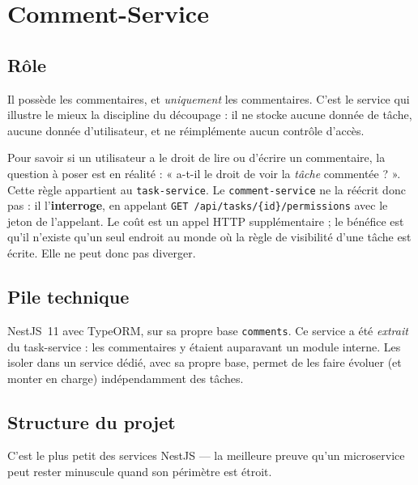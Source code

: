 \documentclass[11pt,a4paper,oneside]{report}
\newcommand{\code}[1]{\texttt{\small #1}}
\begin{document}
\section{Comment-Service}

\subsection{Rôle}

Il possède les commentaires, et \emph{uniquement} les commentaires. C'est le
service qui illustre le mieux la discipline du découpage : il ne stocke aucune
donnée de tâche, aucune donnée d'utilisateur, et ne réimplémente aucun contrôle
d'accès.

\begin{choix}
Pour savoir si un utilisateur a le droit de lire ou d'écrire un commentaire, la
question à poser est en réalité : « a-t-il le droit de voir la \emph{tâche}
commentée ? ». Cette règle appartient au \code{task-service}. Le
\code{comment-service} ne la réécrit donc pas : il l'\textbf{interroge}, en
appelant \code{GET /api/tasks/\{id\}/permissions} avec le jeton de l'appelant.
Le coût est un appel HTTP supplémentaire ; le bénéfice est qu'il n'existe qu'un
seul endroit au monde où la règle de visibilité d'une tâche est écrite. Elle ne
peut donc pas diverger.
\end{choix}

\subsection{Pile technique}

NestJS~11 avec TypeORM, sur sa propre base \code{comments}. Ce service a été
\emph{extrait} du task-service : les commentaires y étaient auparavant un module
interne. Les isoler dans un service dédié, avec sa propre base, permet de les
faire évoluer (et monter en charge) indépendamment des tâches.

\subsection{Structure du projet}

C'est le plus petit des services NestJS — la meilleure preuve qu'un microservice
peut rester minuscule quand son périmètre est étroit.
\end{document}
